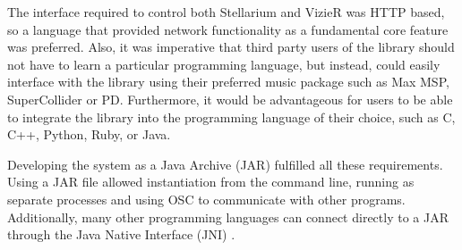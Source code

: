 The interface required to control both Stellarium and VizieR was HTTP based, so a language that provided network functionality as a fundamental core feature was preferred. Also, it was imperative that third party users of the library should not have to learn a particular programming language, but instead, could easily interface with the library using their preferred music package such as Max MSP, SuperCollider or PD. Furthermore, it would be advantageous for users to be able to integrate the library  into the programming language of their choice, such as C, C++, Python, Ruby, or Java.

Developing the system as a Java Archive (JAR) fulfilled all these requirements. Using a JAR file allowed instantiation from the command line, running as separate processes and using OSC to communicate with other programs. Additionally, many other programming languages can connect directly to a JAR through the Java Native Interface (JNI) \cite{liang1999java}. 
